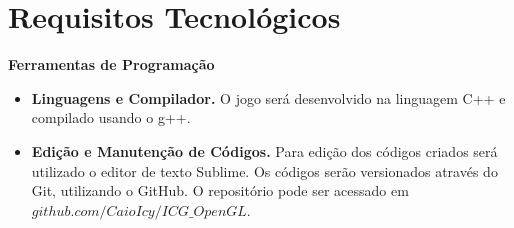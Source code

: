 \section{Requisitos Tecnológicos}

\textbf{Ferramentas de Programação}
\begin{itemize}
\item \textbf{Linguagens e Compilador.} O jogo será desenvolvido na linguagem C++ e compilado usando o g++.
\item \textbf{Edição e Manutenção de Códigos.} Para edição dos códigos criados será
utilizado o editor de texto Sublime. Os códigos serão versionados através do
Git, utilizando o GitHub. O repositório pode ser acessado em $github.com/CaioIcy/ICG\_OpenGL$.
\end{itemize}
